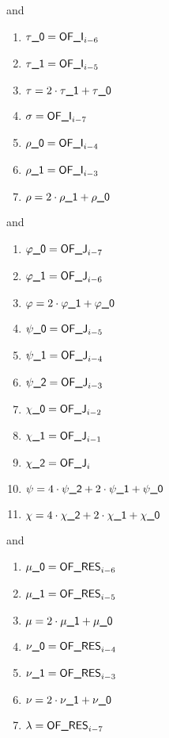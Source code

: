 \noindent and
\begin{multicols}{4}
\begin{enumerate}
	\item $\tau\textsf{\_0}	= \textsf{OF\_I}_{i - 6}$
	\item $\tau\textsf{\_1}	= \textsf{OF\_I}_{i - 5}$
	\item $\tau 			= 2 \cdot \tau\textsf{\_1} + \tau\textsf{\_0}$
	\item $\sigma 			= \textsf{OF\_I}_{i - 7}$
	\item $\rho\textsf{\_0}	= \textsf{OF\_I}_{i - 4}$
	\item $\rho\textsf{\_1}	= \textsf{OF\_I}_{i - 3}$
	\item $\rho 			= 2 \cdot \rho\textsf{\_1} + \rho\textsf{\_0}$
\end{enumerate}
\end{multicols}
\noindent and
\begin{multicols}{4}
\begin{enumerate}
	\item $\varphi\textsf{\_0}	= \textsf{OF\_J}_{i - 7}$
	\item $\varphi\textsf{\_1}	= \textsf{OF\_J}_{i - 6}$
	\item $\varphi 			=                         2 \cdot \varphi\textsf{\_1} + \varphi\textsf{\_0}$
	\item $\psi\textsf{\_0}	= \textsf{OF\_J}_{i - 5}$
	\item $\psi\textsf{\_1}	= \textsf{OF\_J}_{i - 4}$
	\item $\psi\textsf{\_2}	= \textsf{OF\_J}_{i - 3}$
	\item $\chi\textsf{\_0}	= \textsf{OF\_J}_{i - 2}$
	\item $\chi\textsf{\_1}	= \textsf{OF\_J}_{i - 1}$
	\item $\chi\textsf{\_2}	= \textsf{OF\_J}_{i}$
	\item $\psi 			= 4 \cdot \psi\textsf{\_2} + 2 \cdot \psi\textsf{\_1} + \psi\textsf{\_0}$
	\item $\chi 			= 4 \cdot \chi\textsf{\_2} + 2 \cdot \chi\textsf{\_1} + \chi\textsf{\_0}$
\end{enumerate}
\end{multicols}
\noindent and
\begin{multicols}{3}
\begin{enumerate}
	\item $\mu\textsf{\_0}		= \textsf{OF\_RES}_{i - 6}$
	\item $\mu\textsf{\_1}		= \textsf{OF\_RES}_{i - 5}$
	\item $\mu				= 2 \cdot \mu\textsf{\_1} + \mu\textsf{\_0}$
	\item $\nu\textsf{\_0}		= \textsf{OF\_RES}_{i - 4}$
	\item $\nu\textsf{\_1}		= \textsf{OF\_RES}_{i - 3}$
	\item $\nu				= 2 \cdot \nu\textsf{\_1} + \nu\textsf{\_0}$
	\item $\lambda 			= \textsf{OF\_RES}_{i - 7}$
\end{enumerate}
\end{multicols}


